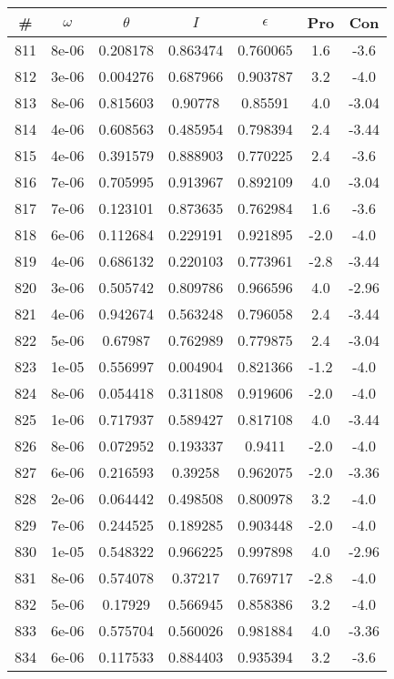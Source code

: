 \begin{table}
\begin{tabular}{c|c|c|c|c|c|c}
\# & $\omega$ & $\theta$ & $I$ & $\epsilon$ & Pro & Con\\
\hline
811 & 8e-06 & 0.208178 & 0.863474 & 0.760065 & 1.6 & -3.6\\
812 & 3e-06 & 0.004276 & 0.687966 & 0.903787 & 3.2 & -4.0\\
813 & 8e-06 & 0.815603 & 0.90778 & 0.85591 & 4.0 & -3.04\\
814 & 4e-06 & 0.608563 & 0.485954 & 0.798394 & 2.4 & -3.44\\
815 & 4e-06 & 0.391579 & 0.888903 & 0.770225 & 2.4 & -3.6\\
816 & 7e-06 & 0.705995 & 0.913967 & 0.892109 & 4.0 & -3.04\\
817 & 7e-06 & 0.123101 & 0.873635 & 0.762984 & 1.6 & -3.6\\
818 & 6e-06 & 0.112684 & 0.229191 & 0.921895 & -2.0 & -4.0\\
819 & 4e-06 & 0.686132 & 0.220103 & 0.773961 & -2.8 & -3.44\\
820 & 3e-06 & 0.505742 & 0.809786 & 0.966596 & 4.0 & -2.96\\
821 & 4e-06 & 0.942674 & 0.563248 & 0.796058 & 2.4 & -3.44\\
822 & 5e-06 & 0.67987 & 0.762989 & 0.779875 & 2.4 & -3.04\\
823 & 1e-05 & 0.556997 & 0.004904 & 0.821366 & -1.2 & -4.0\\
824 & 8e-06 & 0.054418 & 0.311808 & 0.919606 & -2.0 & -4.0\\
825 & 1e-06 & 0.717937 & 0.589427 & 0.817108 & 4.0 & -3.44\\
826 & 8e-06 & 0.072952 & 0.193337 & 0.9411 & -2.0 & -4.0\\
827 & 6e-06 & 0.216593 & 0.39258 & 0.962075 & -2.0 & -3.36\\
828 & 2e-06 & 0.064442 & 0.498508 & 0.800978 & 3.2 & -4.0\\
829 & 7e-06 & 0.244525 & 0.189285 & 0.903448 & -2.0 & -4.0\\
830 & 1e-05 & 0.548322 & 0.966225 & 0.997898 & 4.0 & -2.96\\
831 & 8e-06 & 0.574078 & 0.37217 & 0.769717 & -2.8 & -4.0\\
832 & 5e-06 & 0.17929 & 0.566945 & 0.858386 & 3.2 & -4.0\\
833 & 6e-06 & 0.575704 & 0.560026 & 0.981884 & 4.0 & -3.36\\
834 & 6e-06 & 0.117533 & 0.884403 & 0.935394 & 3.2 & -3.6\\

\end{tabular}
\end{table}
